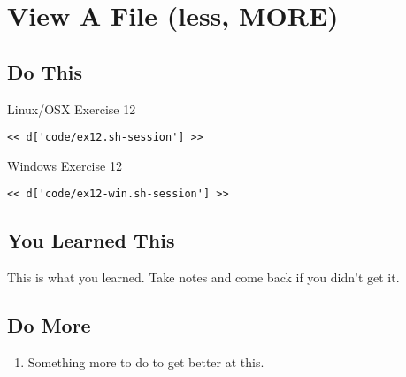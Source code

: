 \chapter{View A File (less, MORE)}

\section{Do This}

\begin{code}{Linux/OSX Exercise 12}
\begin{Verbatim}
<< d['code/ex12.sh-session'] >>
\end{Verbatim}
\end{code}

\begin{code}{Windows Exercise 12}
\begin{Verbatim}
<< d['code/ex12-win.sh-session'] >>
\end{Verbatim}
\end{code}

\section{You Learned This}

This is what you learned.  Take notes and come back if you didn't get it.

\section{Do More}

\begin{enumerate}
\item Something more to do to get better at this.
\end{enumerate}

